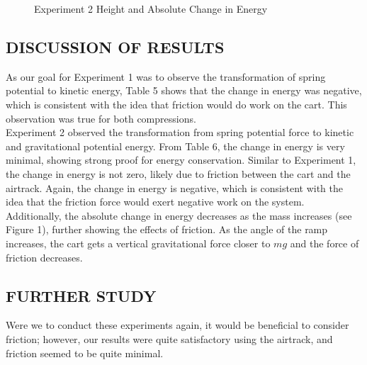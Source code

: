 \documentclass [12pt, letterpaper, twoside] {article}
\begin{document}
\begin {figure}[h!]
  \centering
  \caption {Experiment 2 Height and Absolute Change in Energy}
\end {figure}

\subsection* {DISCUSSION OF RESULTS}
As our goal for Experiment 1 was to observe the transformation of spring potential to kinetic energy, Table 5 shows that the change in energy was negative, which is consistent with the idea that friction would do work on the cart. This observation was true for both compressions. \\

\noindent
Experiment 2 observed the transformation from spring potential force to kinetic and gravitational potential energy. From Table 6, the change in energy is very minimal, showing strong proof for energy conservation. Similar to Experiment 1, the change in energy is not zero, likely due to friction between the cart and the airtrack. Again, the change in energy is negative, which is consistent with the idea that the friction force would exert negative work on the system. Additionally, the absolute change in energy decreases as the mass increases (see Figure 1), further showing the effects of friction. As the angle of the ramp increases, the cart gets a vertical gravitational force closer to \(mg\) and the force of friction decreases.

\subsection* {FURTHER STUDY}
Were we to conduct these experiments again, it would be beneficial to consider friction; however, our results were quite satisfactory using the airtrack, and friction seemed to be quite minimal.
\end{document}
